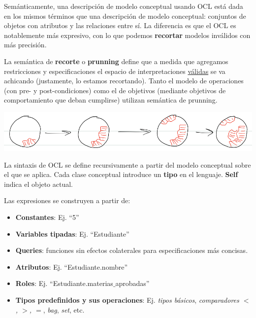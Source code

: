 \documentclass[]{article}
\begin{document}
Semánticamente, una descripción de modelo conceptual usando OCL está dada en los mismos términos que una descripción de modelo conceptual: conjuntos de objetos con atributos y las relaciones entre sí. La diferencia es que el OCL es notablemente más expresivo, con lo que podemos \textbf{recortar} modelos inválidos con más precisión.

La semántica de \textbf{recorte} o \textbf{prunning} define que a medida que agregamos restricciones y especificaciones el espacio de interpretaciones \underline{válidas} se va achicando (justamente, lo estamos recortando). Tanto el modelo de operaciones (con pre- y post-condiciones) como el de objetivos (mediante objetivos de comportamiento que deban cumplirse) utilizan semántica de prunning.

\begin{center}
	\includegraphics[scale=0.5]{Prunning.png}
\end{center}

La sintaxis de OCL se define recursivamente a partir del modelo conceptual sobre el que se aplica. Cada clase conceptual introduce un \textbf{tipo} en el lenguaje. \textbf{Self} indica el objeto actual.

Las expresiones se construyen a partir de:
\begin{itemize}
	\item \textbf{Constantes}: Ej. ``5''
	\item \textbf{Variables tipadas}: Ej. ``Estudiante''
	\item \textbf{Queries}: funciones sin efectos colaterales para especificaciones más concisas.
	\item \textbf{Atributos}: Ej. ``Estudiante.nombre''
	\item \textbf{Roles}: Ej. ``Estudiante.materias$\_$aprobadas''
	\item \textbf{Tipos predefinidos y sus operaciones}: Ej. \textit{tipos básicos}, \textit{comparadores $<$, $>$, $=$}, \textit{bag}, \textit{set}, etc.
\end{itemize}

~\newline
\end{document}
